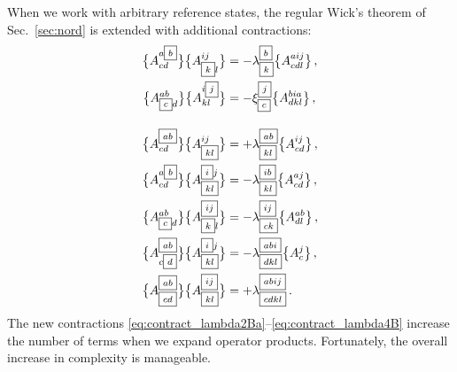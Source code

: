 {When we work with arbitrary reference states, the regular Wick's 
theorem of Sec.~\ref{sec:nord} is extended with additional contractions:
{\setlength{\fboxsep}{1pt}
\begin{align}
  \nord{A^{a{\fbox{\scriptsize $b$}}}_{cd}}\nord{A^{ij}_{\fbox{\scriptsize $k$}l}} &= - \lambda^{\fbox{\scriptsize $b$}}_{\fbox{\scriptsize $k$}}\nord{A^{aij}_{cdl}}\,,\label{eq:contract_lambda1B}\\ 
  \nord{A^{ab}_{\fbox{\scriptsize $c$}d}}\nord{A^{i\fbox{\scriptsize $j$}}_{kl}} &= - \xi^{\fbox{\scriptsize $j$}}_{\fbox{\scriptsize $c$}}\nord{A^{bia}_{dkl}}\,,\label{eq:contract_chi1B}\\[10pt]
  \nord{A^{\fbox{\scriptsize $ab$}}_{cd}}\nord{A^{ij}_{\fbox{\scriptsize $kl$}}} &= + \lambda^{\fbox{\scriptsize $ab$}}_{\fbox{\scriptsize $kl$}}\nord{A^{ij}_{cd}}\,,\label{eq:contract_lambda2Ba}\\ 
  \nord{A^{a{\fbox{\scriptsize $b$}}}_{cd}}\nord{A^{\fbox{\scriptsize $i$}j}_{\fbox{\scriptsize $kl$}}} &= - \lambda^{\fbox{\scriptsize $ib$}}_{\fbox{\scriptsize $kl$}}\nord{A^{aj}_{cd}}\,,\label{eq:contract_lambda2Bb}\\ 
  \nord{A^{ab}_{\fbox{\scriptsize $c$}d}}\nord{A^{\fbox{\scriptsize $ij$}}_{\fbox{\scriptsize $k$}l}} &= - \lambda^{\fbox{\scriptsize $ij$}}_{\fbox{\scriptsize $ck$}}\nord{A^{ab}_{dl}}\,,\label{eq:contract_lambda2Bc}\\ 
  \nord{A^{\fbox{\scriptsize $ab$}}_{c\fbox{\scriptsize$d$}}}\nord{A^{\fbox{\scriptsize $i$}j}_{\fbox{\scriptsize $kl$}}} &= - \lambda^{\fbox{\scriptsize $abi$}}_{\fbox{\scriptsize $dkl$}}\nord{A^{j}_{c}}\,,\label{eq:contract_lambda3B}\\ 
  \nord{A^{\fbox{\scriptsize $ab$}}_{\fbox{\scriptsize$cd$}}}\nord{A^{\fbox{\scriptsize $ij$}}_{\fbox{\scriptsize $kl$}}} &= +\lambda^{\fbox{\scriptsize $abij$}}_{\fbox{\scriptsize $cdkl$}}\,.\label{eq:contract_lambda4B}
\end{align}
}
The new contractions \eqref{eq:contract_lambda2Ba}--\eqref{eq:contract_lambda4B} 
increase the number of terms when we expand operator products. Fortunately,
the overall increase in complexity is manageable.

}
